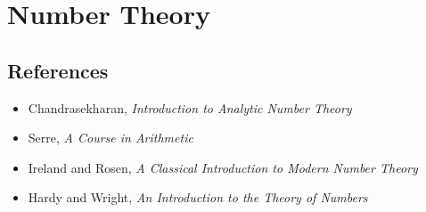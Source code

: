 \section{Number Theory}
\subsection*{References}
\begin{itemize}
    \item Chandrasekharan, \emph{Introduction to Analytic Number Theory}
    \item Serre, \emph{A Course in Arithmetic}
    \item Ireland and Rosen, \emph{A Classical Introduction to Modern Number
        Theory}
    \item Hardy and Wright, \emph{An Introduction to the Theory of Numbers}
\end{itemize}
